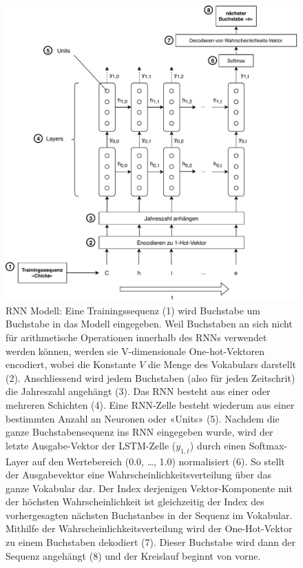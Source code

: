 \begin{figure}
    \centering
    \includegraphics[width=0.9\linewidth]{images/diagrams/model.pdf}
    \caption{RNN Modell: Eine Trainingssequenz (1) wird Buchstabe um Buchstabe in das Modell eingegeben.
    Weil Buchstaben an sich nicht für arithmetische Operationen innerhalb des RNNs verwendet werden können, werden sie V-dimensionale One-hot-Vektoren encodiert, wobei die Konstante $ V $ die Menge des Vokabulars darstellt (2).
    Anschliessend wird jedem Buchstaben (also für jeden Zeitschrit) die Jahreszahl angehängt (3).
    Das RNN besteht aus einer oder mehreren Schichten (4).
    Eine RNN-Zelle besteht wiederum aus einer bestimmten Anzahl an Neuronen oder «Units» (5).
    Nachdem die ganze Buchstabensequenz ins RNN eingegeben wurde, wird der letzte Ausgabe-Vektor der LSTM-Zelle ($ y_{1,t} $) durch einen Softmax-Layer auf den Wertebereich (0.0, …, 1.0) normalisiert (6).
    So stellt der Ausgabevektor eine Wahrscheinlichkeitsverteilung über das ganze Vokabular dar.
    Der Index derjenigen Vektor-Komponente mit der höchsten Wahrscheinlichkeit ist gleichzeitig der Index des vorhergesagten nächsten Buchstanbes in der Sequenz im Vokabular.
    Mithilfe der Wahrscheinlichkeitsverteilung wird der One-Hot-Vektor zu einem Buchstaben dekodiert (7).
    Dieser Buchstabe wird dann der Sequenz angehängt (8) und der Kreislauf beginnt von vorne.}
    \label{fig:rnn-model-definition}
\end{figure}


